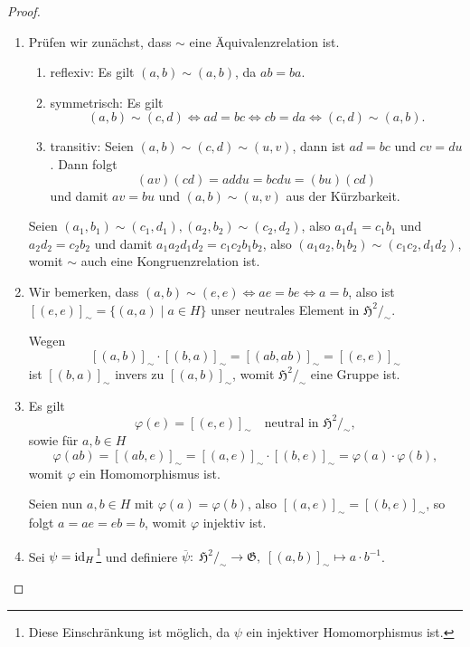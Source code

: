 \begin{proof} {\ }
    \begin{enumerate}
        \item Prüfen wir zunächst, dass $\sim$ eine Äquivalenzrelation ist.
        \begin{enumerate}
            \item reflexiv: Es gilt $(a, b) \sim (a, b)$, da $a b = b a$.
            \item symmetrisch: Es gilt
            $$ (a, b) \sim (c, d) \Leftrightarrow a d = b c \Leftrightarrow c b = d a \Leftrightarrow (c, d) \sim (a, b). $$
            \item transitiv: Seien $(a, b) \sim (c, d) \sim (u, v)$, dann ist $ad = bc$ und $cv = du$. Dann folgt
            $$ (av)(cd) = addu = bcdu = (bu)(cd) $$
            und damit $av = bu$ und $(a, b) \sim (u, v)$ aus der Kürzbarkeit.
        \end{enumerate}
        Seien $(a_1, b_1) \sim (c_1, d_1), (a_2, b_2) \sim (c_2, d_2)$, also $a_1 d_1 = c_1 b_1$ und $a_2 d_2 = c_2 b_2$ und damit $a_1 a_2 d_1 d_2 = c_1 c_2 b_1 b_2$, also $(a_1 a_2, b_1 b_2) \sim (c_1 c_2, d_1 d_2)$, womit $\sim$ auch eine Kongruenzrelation ist.

        \item Wir bemerken, dass $(a, b) \sim (e, e) \Leftrightarrow ae = be \Leftrightarrow a = b$, also ist $[(e,e)]_\sim = \{ (a, a) \mid a \in H \}$ unser neutrales Element in $\mathfrak{H}^2 /_\sim$.
        
        Wegen
        $$ [(a,b)]_\sim \cdot [(b,a)]_\sim = [(ab, ab)]_\sim = [(e,e)]_\sim $$
        ist $[(b,a)]_\sim$ invers zu $[(a,b)]_\sim$, womit $\mathfrak{H}^2 /_\sim$ eine Gruppe ist.

        \item Es gilt
        $$ \varphi(e) = [(e,e)]_\sim \quad \textrm{neutral in } \mathfrak{H}^2 /_\sim, $$
        sowie für $a, b \in H$
        $$ \varphi(ab) = [(ab, e)]_\sim = [(a,e)]_\sim \cdot [(b,e)]_\sim = \varphi(a) \cdot \varphi(b), $$
        womit $\varphi$ ein Homomorphismus ist.

        Seien nun $a,b \in H$ mit $\varphi(a) = \varphi(b)$, also $[(a,e)]_\sim = [(b,e)]_\sim$, so folgt $a = ae = eb = b$, womit $\varphi$ injektiv ist.

        \item Sei \obda $\psi = \operatorname{id}_H$\footnote{Diese Einschränkung ist möglich, da $\psi$ ein injektiver Homomorphismus ist.} und definiere $ \overline{\psi} :\; \mathfrak{H}^2 /_\sim \to \mathfrak{G}, \;[(a,b)]_\sim \mapsto a \cdot b^{-1} $.
        

\end{enumerate}
\end{proof}
